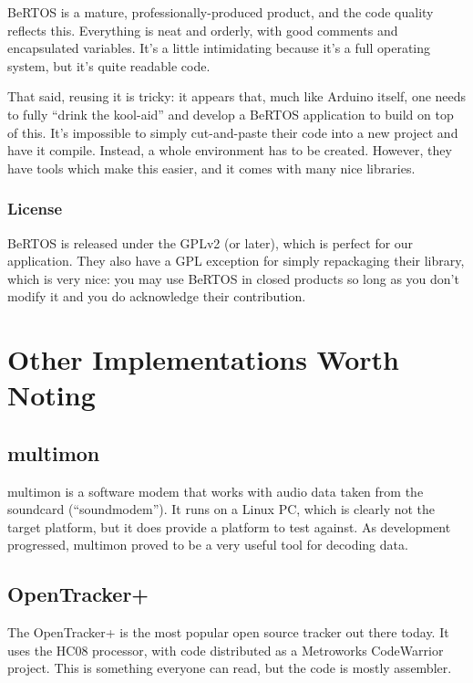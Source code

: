 \documentclass{article}
\begin{document}
BeRTOS is a mature, professionally-produced product, and the code
quality reflects this.  Everything is neat and orderly, with good
comments and encapsulated variables.  It's a little intimidating
because it's a full operating system, but it's quite readable code.

That said, reusing it is tricky: it appears that, much like Arduino
itself, one needs to fully ``drink the kool-aid'' and develop a BeRTOS
application to build on top of this.  It's impossible to simply
cut-and-paste their code into a new project and have it compile.
Instead, a whole environment has to be created.  However, they have
tools which make this easier, and it comes with many nice libraries.

\subsubsection{License}

BeRTOS is released under the GPLv2 (or later), which is perfect for
our application.  They also have a GPL exception for simply repackaging
their library, which is very nice: you may use BeRTOS in closed
products so long as you don't modify it and you do acknowledge their
contribution.



\section{Other Implementations Worth Noting}

\subsection{multimon}

multimon\cite{multimon} is a software modem that works with audio data taken from the
soundcard (``soundmodem'').  It runs on a Linux PC, which is clearly
not the target platform, but it does provide a platform to test
against.  As development progressed, multimon proved to be a very
useful tool for decoding data.

\subsection{OpenTracker+}

The OpenTracker+\cite{opentracker} is the most popular open source
\aprs tracker out there today.  It uses the HC08 processor, with code
distributed as a Metroworks CodeWarrior project.  This is something
everyone can read, but the code is mostly assembler.
\end{document}
